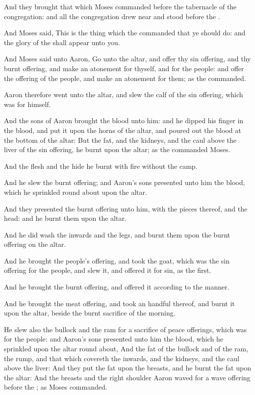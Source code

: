 \Verse And they brought that which Moses commanded before the tabernacle of the congregation: and all the congregation drew near and stood before the \LORD.

\Verse And Moses said, This is the thing which the \LORD commanded that ye should do: and the glory of the \LORD shall appear unto you.

\Verse And Moses said unto Aaron, Go unto the altar, and offer thy sin offering, and thy burnt offering, and make an atonement for thyself, and for the people: and offer the offering of the people, and make an atonement for them; as the \LORD commanded.

\Verse Aaron therefore went unto the altar, and slew the calf of the sin offering, which was for himself.

\Verse And the sons of Aaron brought the blood unto him: and he dipped his finger in the blood, and put it upon the horns of the altar, and poured out the blood at the bottom of the altar: \Verse But the fat, and the kidneys, and the caul above the liver of the sin offering, he burnt upon the altar; as the \LORD commanded Moses.

\Verse And the flesh and the hide he burnt with fire without the camp.

\Verse And he slew the burnt offering; and Aaron's sons presented unto him the blood, which he sprinkled round about upon the altar.

\Verse And they presented the burnt offering unto him, with the pieces thereof, and the head: and he burnt them upon the altar.

\Verse And he did wash the inwards and the legs, and burnt them upon the burnt offering on the altar.

\Verse And he brought the people's offering, and took the goat, which was the sin offering for the people, and slew it, and offered it for sin, as the first.

\Verse And he brought the burnt offering, and offered it according to the manner.

\Verse And he brought the meat offering, and took an handful thereof, and burnt it upon the altar, beside the burnt sacrifice of the morning.

\Verse He slew also the bullock and the ram for a sacrifice of peace offerings, which was for the people: and Aaron's sons presented unto him the blood, which he sprinkled upon the altar round about, \Verse And the fat of the bullock and of the ram, the rump, and that which covereth the inwards, and the kidneys, and the caul above the liver: \Verse And they put the fat upon the breasts, and he burnt the fat upon the altar: \Verse And the breasts and the right shoulder Aaron waved for a wave offering before the \LORD; as Moses commanded.

